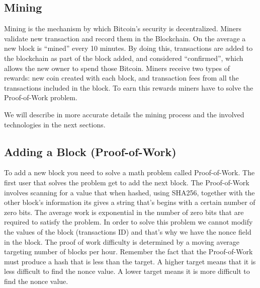 \documentclass{article}
\begin{document}
\subsection*{Mining}
Mining is the mechanism by which Bitcoin’s security is decentralized.\newline
Miners validate new transaction and record them in the Blockchain. On the average a new block is “mined” every 10 minutes. By doing this, transactions are added to the blockchain as part of the block added, and considered “confirmed”, which allows the new owner to spend those Bitcoin.\newline
Miners receive two types of rewards: new coin created with each block, and transaction fees from all the transactions included in the block. To earn this rewards miners have to solve the Proof-of-Work problem.\par
\noindent We will describe in more accurate details the mining process and the involved technologies in the next sections.

\subsection*{Adding a Block (Proof-of-Work)}
To add a new block you need to solve a math problem called Proof-of-Work. The first user that solves the problem get to add the next block.\newline
The Proof-of-Work involves scanning for a value that when hashed, using SHA256, together with the other block's information its gives a string that's begins with a certain number of zero bits. The average work is exponential in the number of zero bits that are required to satisfy the problem.\newline
In order to solve this problem we cannot modify the values of the block (transactions ID) and that's why we have the nonce field in the block.\newline
The proof of work difficulty is determined by a moving average targeting number of blocks per hour. Remember the fact that the Proof-of-Work must produce a hash that is less than the target. A higher target means that it is less difficult to find the nonce value. A lower target means it is more difficult to find the nonce value.
\end{document}
